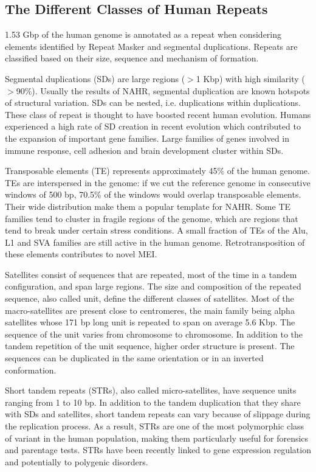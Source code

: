 \subsection{The Different Classes of Human Repeats}

1.53 Gbp of the human genome is annotated as a repeat when considering elements identified by Repeat Masker\cite{Smit2015} and segmental duplications.
Repeats are classified based on their size, sequence and mechanism of formation.

Segmental duplications (SDs) are large regions ($>$1 Kbp) with high similarity ($>$90\%).
Usually the results of NAHR, segmental duplication are known hotspots of structural variation.
SDs can be nested, i.e. duplications within duplications.
These class of repeat is thought to have boosted recent human evolution\cite{Bailey2006}.
Humans experienced a high rate of SD creation in recent evolution which contributed to the expansion of important gene families.
Large families of genes involved in immune response, cell adhesion and brain development cluster within SDs.

Transposable elements (TE) represents approximately 45\% of the human genome.
TEs are interspersed in the genome: if we cut the reference genome in consecutive windows of 500 bp, 70.5\% of the windows would overlap transposable elements.
Their wide distribution make them a popular template for NAHR.
Some TE families tend to cluster in fragile regions of the genome, which are regions that tend to break under certain stress conditions.
A small fraction of TEs of the Alu, L1 and SVA families are still active in the human genome\cite{Mills2007}.
Retrotransposition of these elements contributes to novel MEI.

Satellites consist of sequences that are repeated, most of the time in a tandem configuration, and span large regions.
The size and composition of the repeated sequence, also called unit, define the different classes of satellites.
Most of the macro-satellites are present close to centromeres, the main family being alpha satellites whose 171 bp long unit is repeated to span on average 5.6 Kbp.
The sequence of the unit varies from chromosome to chromosome.
In addition to the tandem repetition of the unit sequence, higher order structure is present.
The sequences can be duplicated in the same orientation or in an inverted conformation.

Short tandem repeats (STRs), also called micro-satellites, have sequence units ranging from 1 to 10 bp.
In addition to the tandem duplication that they share with SDs and satellites, short tandem repeats can vary because of slippage during the replication process.
As a result, STRs are one of the most polymorphic class of variant in the human population, making them particularly useful for forensics and parentage tests.
STRs have been recently linked to gene expression regulation\cite{Gymrek2016,Quilez2016} and potentially to polygenic disorders\cite{Hannan2018}.

